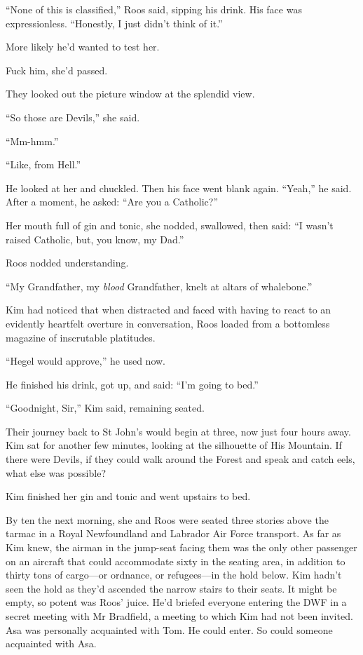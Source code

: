 \documentclass[11pt,a5paper]{article}
\begin{document}
``None of this is classified,'' Roos said, sipping his drink. His face was expressionless. ``Honestly, I just didn't think of it.''

More likely he'd wanted to test her.

Fuck him, she'd passed.

They looked out the picture window at the splendid view.

``So those are Devils,'' she said.

``Mm-hmm.''

``Like, from Hell.''

He looked at her and chuckled. Then his face went blank again. ``Yeah,'' he said. After a moment, he asked: ``Are you a Catholic?''

Her mouth full of gin and tonic, she nodded, swallowed, then said: ``I wasn't raised Catholic, but, you know, my Dad.''

Roos nodded understanding.

``My Grandfather, my \emph{blood} Grandfather, knelt at altars of whalebone.''

Kim had noticed that when distracted and faced with having to react to an evidently heartfelt overture in conversation, Roos loaded from a bottomless magazine of inscrutable platitudes.

``Hegel would approve,'' he used now.

He finished his drink, got up, and said: ``I'm going to bed.''

``Goodnight, Sir,'' Kim said, remaining seated.

Their journey back to St John's would begin at three, now just four hours away. Kim sat for another few minutes, looking at the silhouette of His Mountain. If there were Devils, if they could walk around the Forest and speak and catch eels, what else was possible?

Kim finished her gin and tonic and went upstairs to bed.

\vspace{1em}

By ten the next morning, she and Roos were seated three stories above the tarmac in a Royal Newfoundland and Labrador Air Force transport. As far as Kim knew, the airman in the jump-seat facing them was the only other passenger on an aircraft that could accommodate sixty in the seating area, in addition to thirty tons of cargo---or ordnance, or refugees---in the hold below. Kim hadn't seen the hold as they'd ascended the narrow stairs to their seats. It might be empty, so potent was Roos' juice. He'd briefed everyone entering the DWF in a secret meeting with Mr Bradfield, a meeting to which Kim had not been invited. Asa was personally acquainted with Tom. He could enter. So could someone acquainted with Asa.
\end{document}
